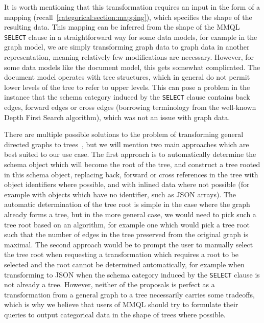 It is worth mentioning that this transformation requires an input in the form of a mapping (recall~\cref{categorical:section:mapping}), which specifies the shape of the resulting data.
This mapping can be inferred from the shape of the MMQL \texttt{SELECT} clause in a straightforward way for some data models, for example in the graph model, we are simply transforming graph data to graph data in another representation, meaning relatively few modifications are necessary.
However, for some data models like the document model, this gets somewhat complicated.
The document model operates with tree structures, which in general do not permit lower levels of the tree to refer to upper levels.
This can pose a problem in the instance that the schema category induced by the \texttt{SELECT} clause contains back edges, forward edges or cross edges (borrowing terminology from the well-known Depth First Search algorithm), which was not an issue with graph data.

There are multiple possible solutions to the problem of transforming general directed graphs to trees~\cite{graph_tree_transform}, but we will mention two main approaches which are best suited to our use case.
The first approach is to automatically determine the schema object which will become the root of the tree, and construct a tree rooted in this schema object, replacing back, forward or cross references in the tree with object identifiers where possible, and with inlined data where not possible (for example with objects which have no identifier, such as JSON arrays).
The automatic determination of the tree root is simple in the case where the graph already forms a tree, but in the more general case, we would need to pick such a tree root based on an algorithm, for example one which would pick a tree root such that the number of edges in the tree preserved from the original graph is maximal.
The second approach would be to prompt the user to manually select the tree root when requesting a transformation which requires a root to be selected and the root cannot be determined automatically, for example when transforming to JSON when the schema category induced by the \texttt{SELECT} clause is not already a tree.
However, neither of the proposals is perfect as a transformation from a general graph to a tree necessarily carries some tradeoffs, which is why we believe that users of MMQL should try to formulate their queries to output categorical data in the shape of trees where possible.
